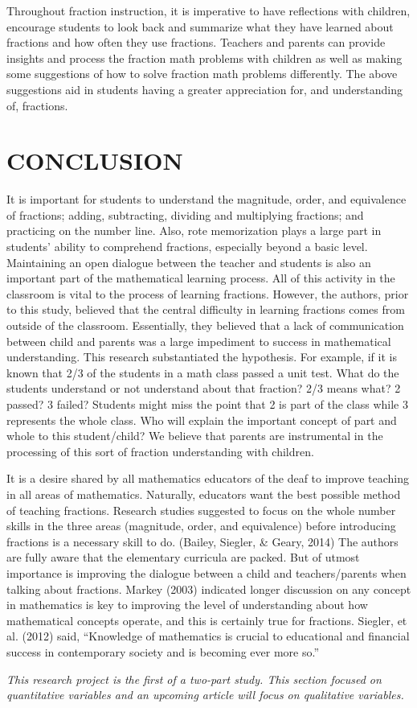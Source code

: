 \documentclass[11.5pt]{sig-alternate} %
\begin{document}
\begin{large}
Throughout fraction instruction, it is imperative to have reflections with children, encourage students to look back and summarize what they have learned about fractions and how often they use fractions. Teachers and parents can provide insights and process the fraction math problems with children as well as making some suggestions of how to solve fraction math problems differently. The above suggestions aid in students having a greater appreciation for, and understanding of, fractions.

\section*{CONCLUSION}

It is important for students to understand the magnitude, order, and equivalence of fractions; adding, subtracting, dividing and multiplying fractions; and practicing on the number line. Also, rote memorization plays a large part in students’ ability to comprehend fractions, especially beyond a basic level. Maintaining an open dialogue between the teacher and students is also an important part of the mathematical learning process.  All of this activity in the classroom is vital to the process of learning fractions. However, the authors, prior to this study, believed that the central difficulty in learning fractions comes from outside of the classroom. Essentially, they believed that a lack of communication between child and parents was a large impediment to success in mathematical understanding. This research substantiated the hypothesis. For example, if it is known that 2/3 of the students in a math class passed a unit test. What do the students understand or not understand about that fraction? 2/3 means what? 2 passed? 3 failed? Students might miss the point that 2 is part of the class while 3 represents the whole class. Who will explain the important concept of part and whole to this student/child?  We believe that parents are instrumental in the processing of this sort of fraction understanding with children. 

It is a desire shared by all mathematics educators of the deaf to improve teaching in all areas of mathematics. Naturally, educators want the best possible method of teaching fractions. Research studies suggested to focus on the whole number skills in the three areas (magnitude, order, and equivalence) before introducing fractions is a necessary skill to do. (Bailey, Siegler, \& Geary, 2014) The authors are fully aware that the elementary curricula are packed. But of utmost importance is improving the dialogue between a child and teachers/parents when talking about fractions. Markey (2003) indicated longer discussion on any concept in mathematics is key to improving the level of understanding about how mathematical concepts operate, and this is certainly true for fractions. Siegler, et al. (2012) said, “Knowledge of mathematics is crucial to educational and financial success in contemporary society and is becoming ever more so.” 

\textit{This research project is the first of a two-part study. This section focused on quantitative variables and an upcoming article will focus on qualitative variables.}

\end{large}
\end{document}
